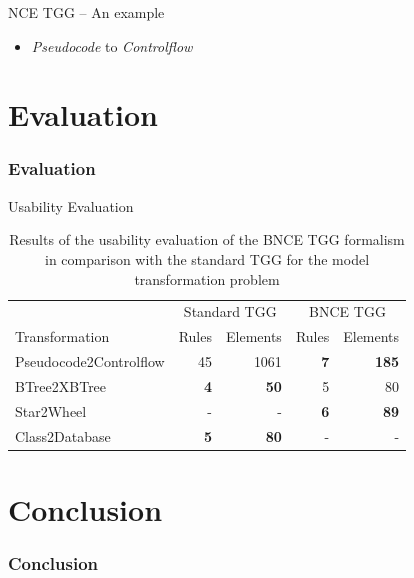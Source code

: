 \documentclass[usenames,dvipsnames]{beamer}
\begin{document}
	\begin{frame}{NCE TGG -- An example}
		\begin{itemize}
			\item \emph{Pseudocode} to \emph{Controlflow}
		\end{itemize}
		
		
	\end{frame}
	
	
	
	\section{Evaluation}
	\begin{frame}
		\frametitle{Evaluation}
	\end{frame}
	
	\begin{frame}{Usability Evaluation}
		\footnotesize 
		\begin{table}[h]
			\centering
			\begin{tabular}{l r r r r }
				\hline
				& \multicolumn{2}{c}{Standard TGG} & \multicolumn{2}{c}{BNCE TGG}\\
				Transformation 			& Rules & Elements 	& Rules & Elements\\
				\hline
				Pseudocode2Controlflow	& 45			& 1061	& \textbf{7}	& \textbf{185} \\
				BTree2XBTree			& \textbf{4}	& \textbf{50}	& 5		& 80 \\
				Star2Wheel				& -				& -		& \textbf{6}	& \textbf{89} \\
				Class2Database			& \textbf{5}	& \textbf{80}	& - 	& -  \\
				\hline
			\end{tabular}
			\caption{Results of the usability evaluation of the BNCE TGG formalism in comparison with the standard TGG for the model transformation problem}
		\end{table}
	\end{frame}
	
	\section{Conclusion}
	\begin{frame}
		\frametitle{Conclusion}
	\end{frame}
	
\end{document}
